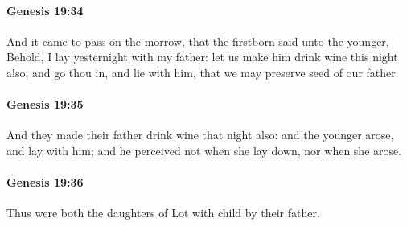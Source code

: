 		\paragraph{Genesis 19:34} %
			\label{GENESIS-19-34}

			And it came to pass on the morrow, that the firstborn said unto the younger, Behold, I lay yesternight with my father: let us make him drink wine this night also; and go thou in, and lie with him, that we may preserve seed of our father.


		\paragraph{Genesis 19:35} %
			\label{GENESIS-19-35}

			And they made their father drink wine that night also: and the younger arose, and lay with him; and he perceived not when she lay down, nor when she arose.


		\paragraph{Genesis 19:36} %
			\label{GENESIS-19-36}

			Thus were both the daughters of Lot with child by their father.



